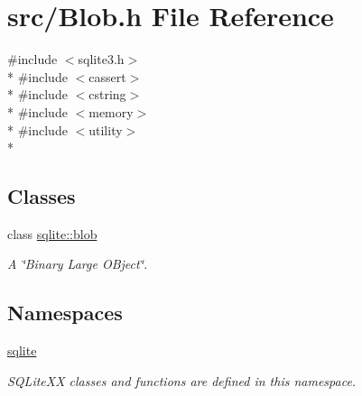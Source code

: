 \hypertarget{a00020}{\section{src/\-Blob.h File Reference}
\label{a00020}
}
{\ttfamily \#include $<$sqlite3.\-h$>$}\\*
{\ttfamily \#include $<$cassert$>$}\\*
{\ttfamily \#include $<$cstring$>$}\\*
{\ttfamily \#include $<$memory$>$}\\*
{\ttfamily \#include $<$utility$>$}\\*
\subsection*{Classes}
\begin{DoxyCompactItemize}
\item 
class \hyperlink{a00002}{sqlite\-::blob}
\begin{DoxyCompactList}\small\item\em A \char`\"{}\-Binary Large O\-Bject\char`\"{}. \end{DoxyCompactList}\end{DoxyCompactItemize}
\subsection*{Namespaces}
\begin{DoxyCompactItemize}
\item 
\hyperlink{a00038}{sqlite}
\begin{DoxyCompactList}\small\item\em S\-Q\-Lite\-X\-X classes and functions are defined in this namespace. \end{DoxyCompactList}\end{DoxyCompactItemize}
